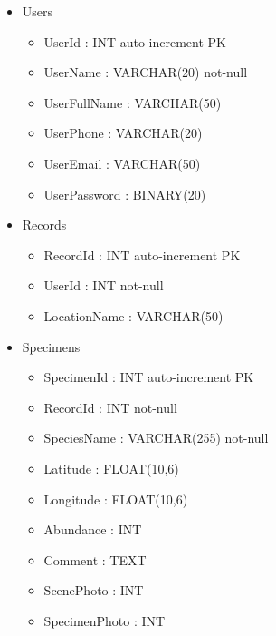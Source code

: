         \begin{itemize}
            \item Users
            \begin{itemize}
                \item UserId : INT auto-increment PK
                \item UserName : VARCHAR(20) not-null
                \item UserFullName : VARCHAR(50)
                \item UserPhone : VARCHAR(20)
                \item UserEmail : VARCHAR(50)
                \item UserPassword : BINARY(20)
            \end{itemize}
                
            \item Records
            \begin{itemize}
                \item RecordId : INT auto-increment PK
                \item UserId : INT not-null
                \item LocationName : VARCHAR(50)
            \end{itemize}
                
            \item Specimens
            \begin{itemize}
                \item SpecimenId : INT auto-increment PK
                \item RecordId : INT not-null
                \item SpeciesName : VARCHAR(255) not-null
                \item Latitude : FLOAT(10,6)
                \item Longitude : FLOAT(10,6)
                \item Abundance : INT
                \item Comment : TEXT
                \item ScenePhoto : INT
                \item SpecimenPhoto : INT   
            \end{itemize}
        \end{itemize}